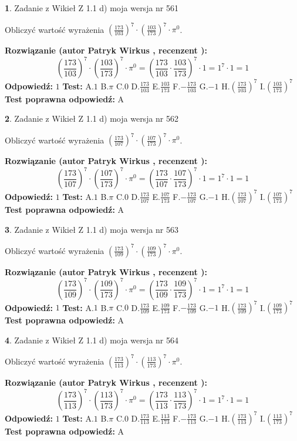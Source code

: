 \documentclass[12pt, a4paper]{article}
\theoremstyle{definition} %
\newtheorem{zad}{}
\newcommand{\zadStart}[1]{\begin{zad}#1\newline}
\newcommand{\zadStop}{\end{zad}}
\newcommand{\rozwStart}[2]{\noindent \textbf{Rozwiązanie (autor #1 , recenzent #2): }\newline}
\newcommand{\rozwStop}{\newline}
\newcommand{\odpStart}{\noindent \textbf{Odpowiedź:}\newline}
\newcommand{\odpStop}{\newline}
\newcommand{\testStart}{\noindent \textbf{Test:}\newline}
\newcommand{\testStop}{\newline}
\newcommand{\kluczStart}{\noindent \textbf{Test poprawna odpowiedź:}\newline}
\newcommand{\kluczStop}{\newline}
\begin{document}
\zadStart{Zadanie z Wikieł Z 1.1 d) moja wersja nr 561}

Obliczyć wartość wyrażenia $(\frac{173}{103})^{7} \cdot (\frac{103}{173})^{7} \cdot \pi^{0}$.
\zadStop
\rozwStart{Patryk Wirkus}{}
$$(\frac{173}{103})^{7} \cdot (\frac{103}{173})^{7} \cdot \pi^{0} = (\frac{173}{103} \cdot \frac{103}{173})^{7} \cdot 1 = 1^{7} \cdot 1 = 1$$
\rozwStop
\odpStart
$1$
\odpStop
\testStart
A.$1$ B.$\pi$ C.$0$ D.$\frac{173}{103}$ E.$\frac{103}{173}$
F.$-\frac{173}{103}$ G.$-1$
H.$(\frac{173}{103})^{7}$
I.$(\frac{103}{173})^{7}$
\testStop
\kluczStart
A
\kluczStop



\zadStart{Zadanie z Wikieł Z 1.1 d) moja wersja nr 562}

Obliczyć wartość wyrażenia $(\frac{173}{107})^{7} \cdot (\frac{107}{173})^{7} \cdot \pi^{0}$.
\zadStop
\rozwStart{Patryk Wirkus}{}
$$(\frac{173}{107})^{7} \cdot (\frac{107}{173})^{7} \cdot \pi^{0} = (\frac{173}{107} \cdot \frac{107}{173})^{7} \cdot 1 = 1^{7} \cdot 1 = 1$$
\rozwStop
\odpStart
$1$
\odpStop
\testStart
A.$1$ B.$\pi$ C.$0$ D.$\frac{173}{107}$ E.$\frac{107}{173}$
F.$-\frac{173}{107}$ G.$-1$
H.$(\frac{173}{107})^{7}$
I.$(\frac{107}{173})^{7}$
\testStop
\kluczStart
A
\kluczStop



\zadStart{Zadanie z Wikieł Z 1.1 d) moja wersja nr 563}

Obliczyć wartość wyrażenia $(\frac{173}{109})^{7} \cdot (\frac{109}{173})^{7} \cdot \pi^{0}$.
\zadStop
\rozwStart{Patryk Wirkus}{}
$$(\frac{173}{109})^{7} \cdot (\frac{109}{173})^{7} \cdot \pi^{0} = (\frac{173}{109} \cdot \frac{109}{173})^{7} \cdot 1 = 1^{7} \cdot 1 = 1$$
\rozwStop
\odpStart
$1$
\odpStop
\testStart
A.$1$ B.$\pi$ C.$0$ D.$\frac{173}{109}$ E.$\frac{109}{173}$
F.$-\frac{173}{109}$ G.$-1$
H.$(\frac{173}{109})^{7}$
I.$(\frac{109}{173})^{7}$
\testStop
\kluczStart
A
\kluczStop



\zadStart{Zadanie z Wikieł Z 1.1 d) moja wersja nr 564}

Obliczyć wartość wyrażenia $(\frac{173}{113})^{7} \cdot (\frac{113}{173})^{7} \cdot \pi^{0}$.
\zadStop
\rozwStart{Patryk Wirkus}{}
$$(\frac{173}{113})^{7} \cdot (\frac{113}{173})^{7} \cdot \pi^{0} = (\frac{173}{113} \cdot \frac{113}{173})^{7} \cdot 1 = 1^{7} \cdot 1 = 1$$
\rozwStop
\odpStart
$1$
\odpStop
\testStart
A.$1$ B.$\pi$ C.$0$ D.$\frac{173}{113}$ E.$\frac{113}{173}$
F.$-\frac{173}{113}$ G.$-1$
H.$(\frac{173}{113})^{7}$
I.$(\frac{113}{173})^{7}$
\testStop
\kluczStart
A
\kluczStop
\end{document}
